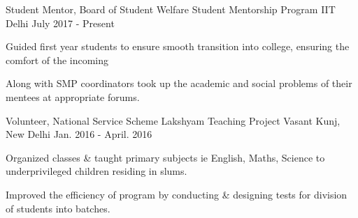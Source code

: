 

\begin{cventries}

  \cventry
    {Student Mentor, Board of Student Welfare} %
    {Student Mentorship Program} %
    {IIT Delhi} %
    {July 2017 - Present} %
    {
      \begin{cvitems} %
        \item {Guided first year students to ensure smooth transition into college, ensuring the comfort of the incoming}
        \item {Along with SMP coordinators took up the academic and social problems of their mentees at appropriate forums.}
      \end{cvitems}
    }

  \cventry
    {Volunteer, National Service Scheme} %
    {Lakshyam Teaching Project} %
    {Vasant Kunj, New Delhi} %
    {Jan. 2016 - April. 2016} %
    {
      \begin{cvitems} %
        \item {Organized classes \& taught primary subjects ie English, Maths, Science to underprivileged children residing in slums.}
        \item {Improved the efficiency of program by conducting \& designing tests for division of students into batches.}
      \end{cvitems}
    }

\end{cventries}
